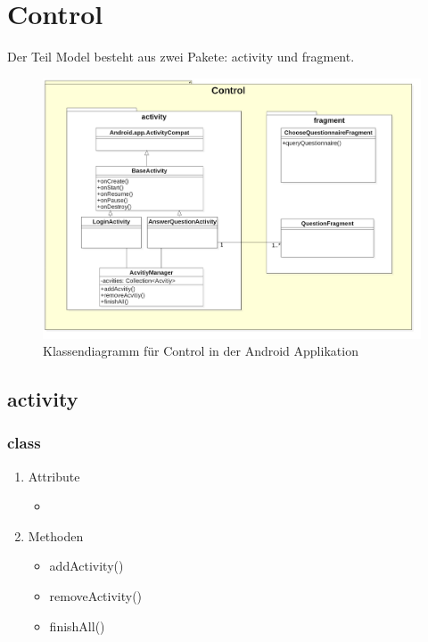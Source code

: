 \documentclass[a4paper]{scrreprt}
\begin{document}
        \section{Control}
         Der Teil Model besteht aus zwei Pakete: activity und fragment.
            \begin{figure}[H]
                \centering
                \includegraphics[scale = 0.3]{ControlClassDiagram(Android).jpg}
                \caption{Klassendiagramm für Control in der Android Applikation }
            \end{figure}

            \subsection{activity}

                \subsubsection{class }
                \begin{enumerate}
                \item Attribute
                     \begin{itemize}
                            \item {}
                     \end{itemize}
                \item Methoden
                     \begin{itemize}
                                \item addActivity()
                                \item removeActivity()
                                \item finishAll()
                     \end{itemize}
                \end{enumerate}
\end{document}
